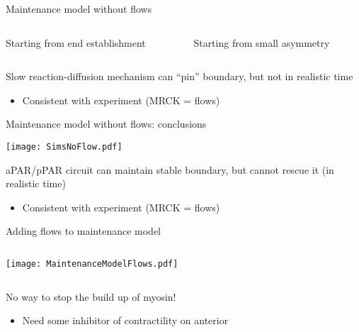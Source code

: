 \documentclass{beamer}
\newcommand{\6}[1]{#1_{\text{6}}}
\newcommand{\3}[1]{#1_{\text{3}}}
\begin{document}
\begin{frame}{Maintenance model without flows}
\begin{columns}
\begin{column}{0.5\textwidth}
Starting from end establishment
\begin{center}
\end{center}
\end{column}
\begin{column}{0.5\textwidth}
Starting from small asymmetry
\begin{center}
\end{center}
\end{column}
\end{columns}
\pause
\vspace{0.5 cm}
Slow reaction-diffusion mechanism can ``pin'' boundary, but not in realistic time
\begin{itemize}
\item Consistent with experiment (MRCK = flows)
\end{itemize}
\end{frame}

\begin{frame}{Maintenance model without flows: conclusions}
\begin{center}
\texttt{[image: SimsNoFlow.pdf]}
\end{center}
aPAR/pPAR circuit can maintain stable boundary, but cannot rescue it (in realistic time)
\begin{itemize}
\item Consistent with experiment (MRCK = flows)
\end{itemize}
\end{frame}

\begin{frame}{Adding flows to maintenance model}
\begin{columns}
\begin{column}{0.5\textwidth}
\begin{center}
\texttt{[image: MaintenanceModelFlows.pdf]}
\end{center}
\end{column}
\begin{column}{0.5\textwidth}
\begin{center}
\end{center}
\end{column}
\end{columns}
\pause
\vspace{0.5 cm}
No way to stop the build up of myosin!
\begin{itemize}
\item Need some inhibitor of contractility on anterior
\end{itemize}
\end{frame}
\end{document}
